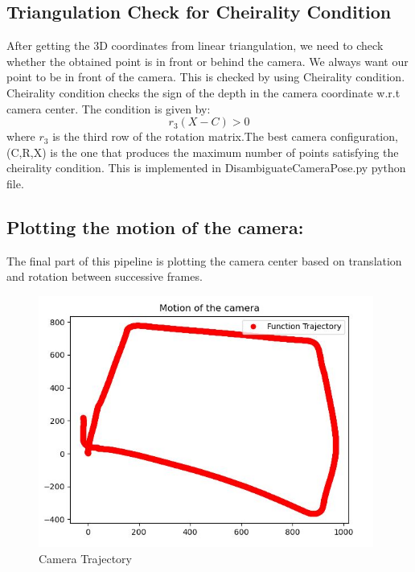 \documentclass[12pt]{article}
\begin{document}
\subsection{Triangulation Check for Cheirality Condition}
After getting the 3D coordinates from linear triangulation, we need to check whether the obtained point is in front or behind the camera. We always want our point to be in front of the camera. This is checked by using Cheirality condition. Cheirality condition checks the sign of the depth in the camera coordinate w.r.t camera center. The condition is given by:
\begin{equation}
r_3(X - C) > 0
\end{equation}
where $r_3$ is the third row of the rotation matrix.The best camera configuration, (C,R,X) is the one that produces the maximum number of points satisfying the cheirality condition. This is implemented in DisambiguateCameraPose.py python file.

\subsection{Plotting the motion of the camera:}
The final part of this pipeline is plotting the camera center based on translation and rotation between successive frames.
\begin{figure}[h]
    \centering
    \includegraphics[width=11cm]{output1}
    \caption{Camera Trajectory}
    \label{fig:Camera Trajectory}
\end{figure}
\end{document}
